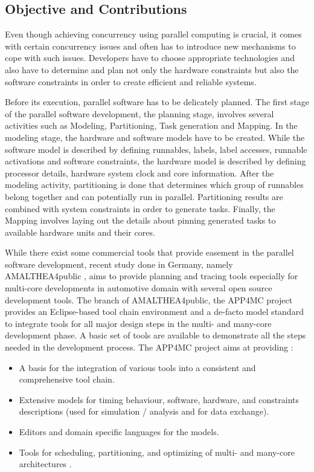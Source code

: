 \subsection{Objective and Contributions}
Even though achieving concurrency using parallel computing is crucial, it comes with certain concurrency issues and often has to introduce new mechanisms to cope with such issues.
Developers have to choose appropriate technologies and also have to determine and plan not only the hardware constraints but also the software constraints in order to create efficient and reliable systems.

Before its execution, parallel software has to be delicately planned. The first stage of the parallel software development, the planning stage, involves several activities such as Modeling, Partitioning, Task generation and Mapping. In the modeling stage, the hardware and software models have to be created. While the software model is described by defining runnables, labels, label accesses, runnable activations and software constraints, the hardware model is described by defining processor details, hardware system clock and core information. %
After the modeling activity, partitioning is done that determines which group of runnables belong together and can potentially run in parallel. Partitioning results are combined with system constraints in order to generate tasks. Finally, the Mapping involves laying out the details about pinning generated tasks to available hardware units and their cores.

While there exist some commercial tools that provide easement in the parallel software development, recent study done in Germany, namely AMALTHEA4public \cite{ICPDSSE} \cite{amalthea4publicweb}, aims to provide planning and tracing tools especially for multi-core developments in automotive domain with several open source development tools. The branch of AMALTHEA4public, the APP4MC project \cite{app4mcproposaleclipse} provides an Eclipse-based tool chain environment and a de-facto model standard to integrate tools for all major design steps in the multi- and many-core development phase. A basic set of tools are available to demonstrate all the steps needed in the development process. The APP4MC project aims at providing \cite{app4mcproposaleclipse}:

\begin{itemize}
	\item A basis for the integration of various tools into a consistent and comprehensive tool chain.
	\item Extensive models for timing behaviour, software, hardware, and constraints descriptions (used for simulation / analysis and for data exchange).
	\item Editors and domain specific languages for the models.
	\item Tools for scheduling, partitioning, and optimizing of multi- and many-core architectures \cite{app4mcproposaleclipse}.
\end{itemize}

